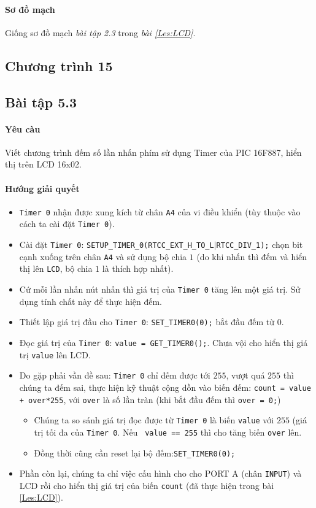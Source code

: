 \paragraph{Sơ đồ mạch}Giống sơ đồ mạch \emph{bài tập 2.3} trong \emph{bài \ref{Les:LCD}}.
\subsection*{Chương trình 15}

\subsection{Bài tập 5.3}
\paragraph{Yêu càu}Viết chương trình đếm số lần nhấn phím sử dụng Timer của PIC 16F887, hiển thị trên LCD 16x02.
\paragraph{Hướng giải quyết}
\begin{itemize}
\item \verb|Timer 0| nhận được xung kích từ chân \verb|A4| của vi điều khiển (tùy thuộc vào cách ta cài đặt \verb|Timer 0|).
\item Cài đặt \verb|Timer 0|: \verb|SETUP_TIMER_0(RTCC_EXT_H_TO_L|$|$\verb|RTCC_DIV_1);| chọn bit cạnh xuống trên chân \verb|A4| và sử dụng bộ chia $1$ (do khi nhấn thì đếm và hiển thị lên \verb|LCD|, bộ chia $1$ là thích hợp nhất).
\item Cứ mỗi lần nhấn nút nhấn thì giá trị của \verb|Timer 0| tăng lên một giá trị. Sử dụng tính chất này để thực hiện đếm.
\item Thiết lập giá trị đầu cho \verb|Timer 0|: \verb|SET_TIMER0(0);| bắt đầu đếm từ 0.
\item Đọc giá trị của \verb|Timer 0|: \verb|value = GET_TIMER0();|. Chưa vội cho hiển thị giá trị \verb|value| lên LCD.
\item Do gặp phải vần đề sau: \verb|Timer 0| chỉ đếm được tới $255$, vượt quá $255$ thì chúng ta đếm sai, thực hiện kỹ thuật cộng dồn vào biến đếm: \verb|count = value + over*255|, với \verb|over| là số lần tràn (khi bắt đầu đếm thì \verb|over = 0;|)
\begin{itemize}
\item Chúng ta so sánh giá trị đọc được từ \verb|Timer 0| là biến \verb|value| với $255$ (giá trị tối đa của \verb|Timer 0|. Nếu \verb| value == 255| thì cho tăng biến \verb|over| lên.
\item Đồng thời cũng cần reset lại bộ đếm:\verb|SET_TIMER0(0);|
\end{itemize}
\item Phần còn lại, chúng ta chỉ việc cấu hình cho cho PORT A (chân \verb|INPUT|) và LCD rồi cho hiển thị giá trị của biến \verb|count| (đã thực hiện trong bài \ref{Les:LCD}).
\end{itemize}
